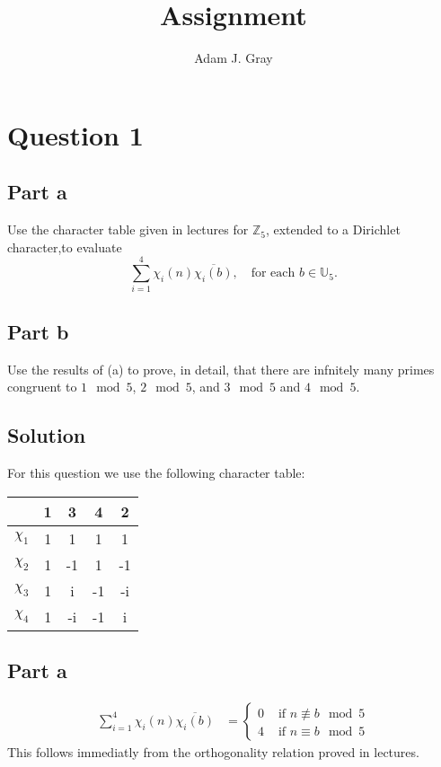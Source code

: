 \documentclass{unswmaths}
\begin{document}
\author{Adam J. Gray}
\subject{Number Theory}
\title{Assignment}

\unswtitle

\section*{Question 1}
\subsection*{Part a}
Use the character table given in lectures for $ \mathbb{Z}_5 $, extended to a Dirichlet character,to evaluate
$$
	\sum_{i=1}^4 \chi_i(n) \overline{ \chi_i(b)}, \ \ \ \text{ for each } b \in \mathbb{U}_5.
$$
\subsection*{Part b}
Use the results of (a) to prove, in detail, that there are infnitely many primes congruent to  $ 1 \mod 5 $,
$ 2 \mod 5 $, and $ 3 \mod 5 $ and $ 4 \mod 5 $.

\subsection*{Solution}
For this question we use the following character table:

\begin{table}[h]
	\centering
	\begin{tabular}{c | c | c | c | c}
		& 1 & 3 & 4 & 2 \\ \hline 
		$\chi_1$ & 1 & 1 & 1 & 1 \\
		\hline
		$\chi_2$ & 1 & -1 & 1 & -1 \\
		\hline
		$\chi_3$ & 1 & i & -1 & -i \\
		\hline
		$\chi_4$ & 1 & -i & -1 & i
	\end{tabular}
\end{table}
	
\subsection*{Part a}
\begin{align*}
	\sum_{i=1}^4 \chi_i(n) \overline{ \chi_i(b)} &=
	\begin{cases}
		0 & \text{ if } n \not\equiv b \mod 5 \\
		4 & \text{ if } n \equiv b \mod 5
	\end{cases}
\end{align*}
This follows immediatly from the orthogonality relation proved in lectures.
\end{document}
